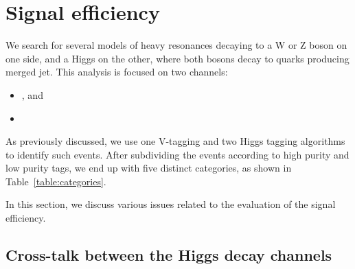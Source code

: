 \section{Signal efficiency}
\label{sec:signal}

We search for several models of heavy resonances decaying to
a W or Z boson on one side, and a Higgs on the other, where both bosons 
decay to quarks producing merged jet.  This analysis is focused on two
channels:
\begin{itemize}
\item \HbbVqq, and
\item \HwwVqq
\end{itemize}
As previously discussed, we use one V-tagging and two Higgs tagging algorithms
to identify such events.  After subdividing the events according to 
high purity and low purity tags, we end up with five distinct categories,
as shown in Table~\ref{table:categories}.

In this section, we discuss various issues related to the evaluation
of the signal efficiency.












\subsection{Cross-talk between the Higgs decay channels}
\label{sec:cross-talk}

